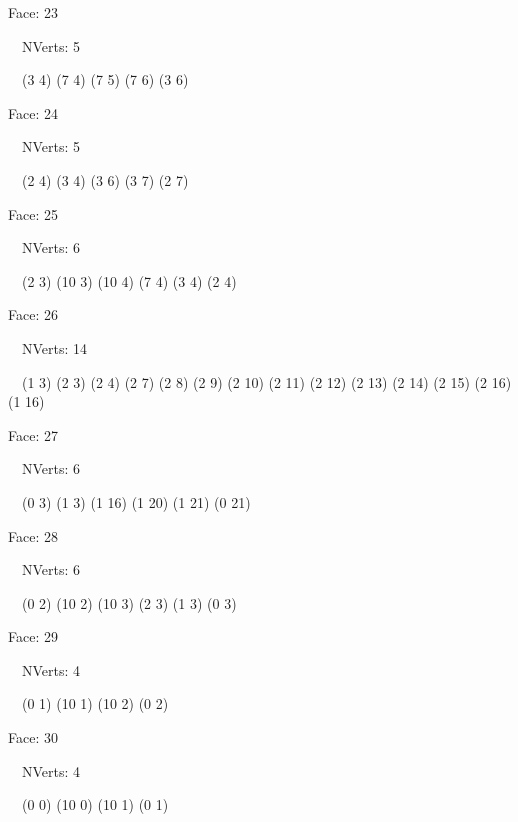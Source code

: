 \documentclass{article}
\begin{document}
{\footnotesize 

Face: 23

\   \    NVerts: 5

 \   \   (3 4) (7 4) (7 5) (7 6) (3 6)}

{\footnotesize 

Face: 24

\   \    NVerts: 5

 \   \   (2 4) (3 4) (3 6) (3 7) (2 7)}

{\footnotesize 

Face: 25

\   \    NVerts: 6

 \   \   (2 3) (10 3) (10 4) (7 4) (3 4) (2 4)}

{\footnotesize 

Face: 26

\   \    NVerts: 14

 \   \   (1 3) (2 3) (2 4) (2 7) (2 8) (2 9) (2 10) (2 11) (2 12) (2 13) (2 14) (2 15) (2 16) (1 16)}

{\footnotesize 

Face: 27

\   \    NVerts: 6

 \   \   (0 3) (1 3) (1 16) (1 20) (1 21) (0 21)}

{\footnotesize 

Face: 28

\   \    NVerts: 6

 \   \   (0 2) (10 2) (10 3) (2 3) (1 3) (0 3)}

{\footnotesize 

Face: 29

\   \    NVerts: 4

 \   \   (0 1) (10 1) (10 2) (0 2)}

{\footnotesize 

Face: 30

\   \    NVerts: 4

 \   \   (0 0) (10 0) (10 1) (0 1)}


 \newpage
\end{document}
